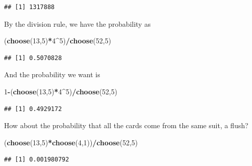 \documentclass[]{book}
\newenvironment{Shaded}{\begin{snugshade}}{\end{snugshade}}
\newcommand{\KeywordTok}[1]{\textcolor[rgb]{0.13,0.29,0.53}{\textbf{#1}}}
\newcommand{\DecValTok}[1]{\textcolor[rgb]{0.00,0.00,0.81}{#1}}
\newcommand{\OperatorTok}[1]{\textcolor[rgb]{0.81,0.36,0.00}{\textbf{#1}}}
\newcommand{\NormalTok}[1]{#1}
\theoremstyle{definition}
\theoremstyle{definition}
\theoremstyle{definition}
\theoremstyle{remark}
\begin{document}
\begin{verbatim}
## [1] 1317888
\end{verbatim}

By the division rule, we have the probability as

\begin{Shaded}
\begin{Highlighting}[]
\NormalTok{(}\KeywordTok{choose}\NormalTok{(}\DecValTok{13}\NormalTok{,}\DecValTok{5}\NormalTok{)}\OperatorTok{*}\DecValTok{4}\OperatorTok{^}\DecValTok{5}\NormalTok{)}\OperatorTok{/}\KeywordTok{choose}\NormalTok{(}\DecValTok{52}\NormalTok{,}\DecValTok{5}\NormalTok{)}
\end{Highlighting}
\end{Shaded}

\begin{verbatim}
## [1] 0.5070828
\end{verbatim}

And the probability we want is

\begin{Shaded}
\begin{Highlighting}[]
\DecValTok{1}\OperatorTok{-}\NormalTok{(}\KeywordTok{choose}\NormalTok{(}\DecValTok{13}\NormalTok{,}\DecValTok{5}\NormalTok{)}\OperatorTok{*}\DecValTok{4}\OperatorTok{^}\DecValTok{5}\NormalTok{)}\OperatorTok{/}\KeywordTok{choose}\NormalTok{(}\DecValTok{52}\NormalTok{,}\DecValTok{5}\NormalTok{)}
\end{Highlighting}
\end{Shaded}

\begin{verbatim}
## [1] 0.4929172
\end{verbatim}

How about the probability that all the cards come from the same suit, a
flush?

\begin{Shaded}
\begin{Highlighting}[]
\NormalTok{(}\KeywordTok{choose}\NormalTok{(}\DecValTok{13}\NormalTok{,}\DecValTok{5}\NormalTok{)}\OperatorTok{*}\KeywordTok{choose}\NormalTok{(}\DecValTok{4}\NormalTok{,}\DecValTok{1}\NormalTok{))}\OperatorTok{/}\KeywordTok{choose}\NormalTok{(}\DecValTok{52}\NormalTok{,}\DecValTok{5}\NormalTok{)}
\end{Highlighting}
\end{Shaded}

\begin{verbatim}
## [1] 0.001980792
\end{verbatim}
\end{document}
